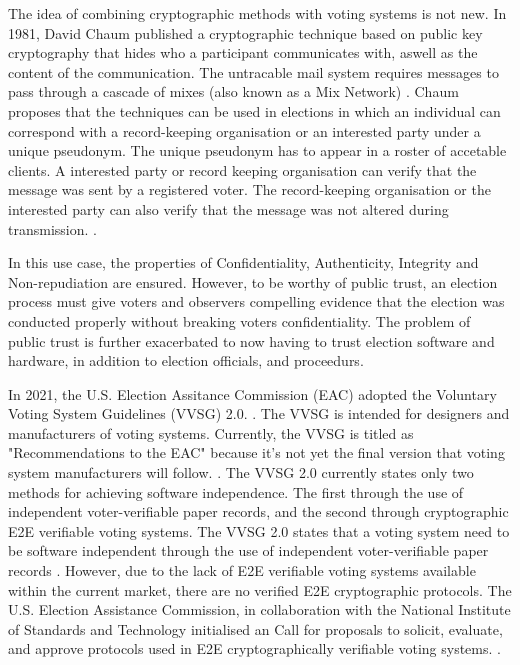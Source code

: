 The idea of combining cryptographic methods with voting systems is not new. In 1981, David Chaum published a cryptographic technique based on public key cryptography that hides who a participant communicates with, aswell as the content of the communication. The untracable mail system requires messages to pass through a cascade of mixes (also known as a Mix Network) \cite[86]{chaum}. Chaum proposes that the techniques can be used in elections in which an individual can correspond with a record-keeping organisation or an interested party under a unique pseudonym. The unique pseudonym has to appear in a roster of accetable clients. A interested party or record keeping organisation can verify that the message was sent by a registered voter. The record-keeping organisation or the interested party can also verify that the message was not altered during transmission. \cite[84]{chaum}. 

In this use case, the properties of Confidentiality, Authenticity, Integrity and Non-repudiation are ensured. However, to be worthy of public trust, an election process must give voters and observers compelling evidence that the election was conducted properly without breaking voters confidentiality. The problem of public trust is further exacerbated to now having to trust election software and hardware, in addition to election officials, and proceedurs.

In 2021, the U.S. Election Assitance Commission (EAC) adopted the Voluntary Voting System Guidelines (VVSG) 2.0. \cite{eac-pressrelease}. The VVSG is intended for designers and manufacturers of voting systems. Currently, the VVSG is titled as "Recommendations to the EAC" because it's not yet the final version that voting system manufacturers will follow.
\cite{https://www.nist.gov/itl/voting/vvsg-introduction}. The VVSG 2.0 currently states only two methods for achieving software independence. The first through the use of independent voter-verifiable paper records, and the second through cryptographic E2E verifiable voting systems. The VVSG 2.0 states that a voting system need to be software independent through the use of independent voter-verifiable paper records
\cite[181]{https://www.eac.gov/sites/default/files/TestingCertification/Voluntary_Voting_System_Guidelines_Version_2_0.pdf}. However, due to the lack of E2E verifiable voting systems available within the current market, there are no verified E2E cryptographic protocols.\cite[199]{https://www.eac.gov/sites/default/files/TestingCertification/Voluntary_Voting_System_Guidelines_Version_2_0.pdf} The U.S. Election Assistance Commission, in collaboration with the National Institute of Standards and Technology initialised an Call for proposals to solicit, evaluate, and approve protocols used in E2E cryptographically verifiable voting systems. \cite{https://www.eac.gov/voting-equipment/end-end-e2e-protocol-evaluation-process}. 

